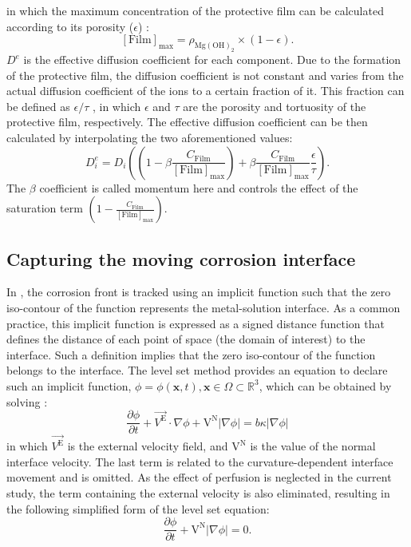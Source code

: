 in which the maximum concentration of the protective film can be calculated according to its porosity ($\epsilon$) \cite{Bajger2016}:
\begin{equation} \label{eq:film_max}
[\mathrm{Film}]_{\max }=\rho_{\mathrm{Mg}(\mathrm{OH})_{2}} \times(1-\epsilon).
\end{equation}
$D^e$ is the effective diffusion coefficient for each component. Due to the formation of the protective film, the diffusion coefficient is not constant and varies from the actual diffusion coefficient of the ions to a certain fraction of it. This fraction can be defined as ${\epsilon}/{\tau}$ \cite{Grathwohl1998,Hoeche2014}, in which $\epsilon$ and $\tau$ are the porosity and tortuosity of the protective film, respectively. The effective diffusion coefficient can be then calculated by interpolating the two aforementioned values:
\begin{equation} \label{eq:diff_coeff}
D_{i}^{e}=D_{i}\left(\left(1-\beta \frac{C_{\mathrm{Film}}}{[\mathrm{Film}]_{\max }}\right)+\beta \frac{C_{\mathrm{Film}}}{[\mathrm{Film}]_{\max }} \frac{\epsilon}{\tau}\right).
\end{equation}
The $\beta$ coefficient is called momentum here and controls the effect of the saturation term $(1-\frac{C_{\mathrm{Film}}}{[\mathrm{Film}]_{\max }})$. 

\subsection{Capturing the moving corrosion interface}

In \biodeg{}, the corrosion front is tracked using an implicit function such that the zero iso-contour of the function represents the metal-solution interface. As a common practice, this implicit function is expressed as a signed distance function that defines the distance of each point of space (the domain of interest) to the interface. Such a definition implies that the zero iso-contour of the function belongs to the interface. The level set method provides an equation to declare such an implicit function, $\phi=\phi(\mathbf{x},t), \mathbf{x} \in \Omega \subset \mathbb{R}^{3}$, which can be obtained by solving \cite{RonaldFedkiw2002}:
\begin{equation} \label{eq:lsm_full}
\frac{\partial \phi}{\partial t}+{\overrightarrow{V^\mathrm{E}} \cdot \nabla \phi}+{\mathrm{V}^\mathrm{N}|\nabla \phi|}={b \kappa|\nabla \phi|}
\end{equation}
in which $\overrightarrow{V^\mathrm{E}}$ is the external velocity field, and  $\mathrm{V}^\mathrm{N}$ is the value of the normal interface velocity. The last term is related to the curvature-dependent interface movement and is omitted. As the effect of perfusion is neglected in the current study, the term containing the external velocity is also eliminated, resulting in the following simplified form of the level set equation:
\begin{equation} \label{eq:lsm_simplified}
\frac{\partial \phi}{\partial t}+\mathrm{V}^\mathrm{N}|\nabla \phi|=0.
\end{equation}


